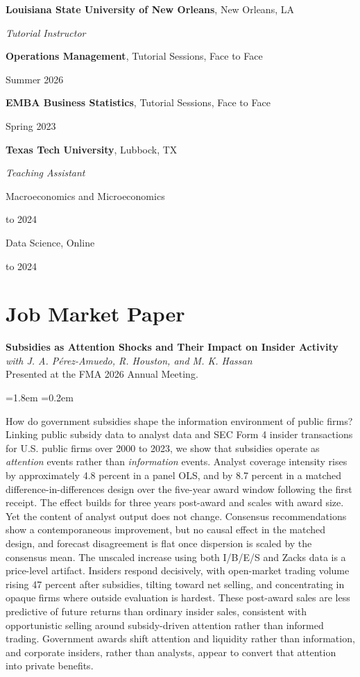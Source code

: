 \documentclass[11pt,letterpaper]{article}
\newcommand{\entry}[2]{%
  \noindent\begin{minipage}[t]{0.72\textwidth}\raggedright #1\end{minipage}%
  \hfill%
  \begin{minipage}[t]{0.27\textwidth}\raggedleft #2\end{minipage}\par
}
\newcommand{\hgap}{\par\vspace{3pt}}
\newcommand{\course}[4]{%
  \entry{\textbf{#1}, #2}{#3}\par\vspace{3pt}%
}
\newenvironment{abstractblock}
  {\begin{list}{}{\leftmargin=1.8em \rightmargin=0.2em \topsep=5pt \parsep=0pt}\item[]\small}
  {\end{list}}
\newcommand{\smallgap}{\par\vspace{5pt}}
\begin{document}
\entry{\textbf{Louisiana State University of New Orleans}, New Orleans, LA}{\textit{Tutorial Instructor}}
\hgap
\course{Operations Management}{Tutorial Sessions, Face to Face}{Summer 2026}{4.9/5.0}
\course{EMBA Business Statistics}{Tutorial Sessions, Face to Face}{Spring 2023}{4.9/5.0}
\smallgap

\entry{\textbf{Texas Tech University}, Lubbock, TX}{\textit{Teaching Assistant}}
\hgap
\entry{Macroeconomics and Microeconomics}{2023 to 2024}
\entry{Data Science, Online}{2023 to 2024}

\section{Job Market Paper}

\textbf{Subsidies as Attention Shocks and Their Impact on Insider Activity}\\[3pt]
\textit{with J. A. P\'erez-Amuedo, R. Houston, and M. K. Hassan}\\
Presented at the FMA 2026 Annual Meeting.

\begin{abstractblock}
How do government subsidies shape the information environment of public firms? Linking public
subsidy data to analyst data and SEC Form 4 insider transactions for U.S. public firms over 2000
to 2023, we show that subsidies operate as \textit{attention} events rather than
\textit{information} events. Analyst coverage intensity rises by approximately 4.8 percent in a
panel OLS, and by 8.7 percent in a matched difference-in-differences design over the five-year
award window following the first receipt. The effect builds for three years post-award and scales
with award size. Yet the content of analyst output does not change. Consensus recommendations show
a contemporaneous improvement, but no causal effect in the matched design, and forecast
disagreement is flat once dispersion is scaled by the consensus mean. The unscaled increase using
both I/B/E/S and Zacks data is a price-level artifact. Insiders respond decisively, with
open-market trading volume rising 47 percent after subsidies, tilting toward net selling, and
concentrating in opaque firms where outside evaluation is hardest. These post-award sales are less
predictive of future returns than ordinary insider sales, consistent with opportunistic selling
around subsidy-driven attention rather than informed trading. Government awards shift attention and
liquidity rather than information, and corporate insiders, rather than analysts, appear to convert
that attention into private benefits.
\end{abstractblock}
\end{document}
